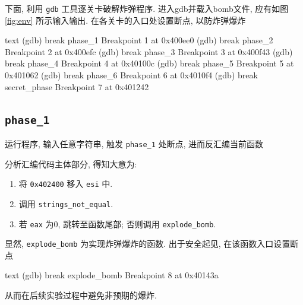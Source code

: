 下面, 利用 \verb|gdb| 工具逐关卡破解炸弹程序. 进入gdb并载入bomb文件, 应有如图 \ref{fig:env} 所示输入输出. 在各关卡的入口处设置断点, 以防炸弹爆炸
\begin{code}{text}
(gdb) break phase_1
Breakpoint 1 at 0x400ee0
(gdb) break phase_2
Breakpoint 2 at 0x400efc
(gdb) break phase_3
Breakpoint 3 at 0x400f43
(gdb) break phase_4
Breakpoint 4 at 0x40100c
(gdb) break phase_5
Breakpoint 5 at 0x401062
(gdb) break phase_6
Breakpoint 6 at 0x4010f4
(gdb) break secret_phase
Breakpoint 7 at 0x401242
\end{code}

\subsection{\texttt{phase_1}}

运行程序, 输入任意字符串, 触发 \verb|phase_1| 处断点, 进而反汇编当前函数
分析汇编代码主体部分, 得知大意为:

\begin{enumerate}[noitemsep]
    \item 将 \verb|0x402400| 移入 \verb|esi| 中.
    \item 调用 \verb|strings_not_equal|.
    \item 若 \verb|eax| 为0, 跳转至函数尾部; 否则调用 \verb|explode_bomb|.
\end{enumerate}
显然, \verb|explode_bomb| 为实现炸弹爆炸的函数. 出于安全起见,
在该函数入口设置断点
\begin{code}{text}
(gdb) break explode_bomb
Breakpoint 8 at 0x40143a
\end{code}
从而在后续实验过程中避免非预期的爆炸.

